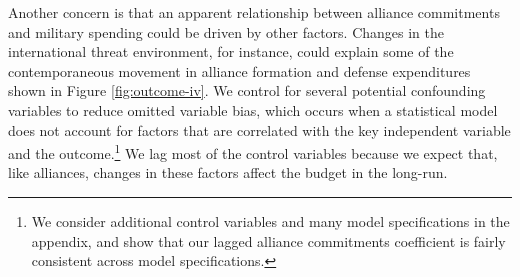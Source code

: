 \documentclass[12pt,hidelinks]{article}
\begin{document}
Another concern is that an apparent relationship between alliance commitments and military spending could be driven by other factors. 
Changes in the international threat environment, for instance, could explain some of the contemporaneous movement in alliance formation and defense expenditures shown in Figure \ref{fig:outcome-iv}.
We control for several potential confounding variables to reduce omitted variable bias, which occurs when a statistical model does not account for factors that are correlated with the key independent variable and the outcome.\footnote{We consider additional control variables and many model specifications in the appendix, and show that our lagged alliance commitments coefficient is fairly consistent across model specifications.} 
We lag most of the control variables because we expect that, like alliances, changes in these factors affect the budget in the long-run. 
\end{document}
